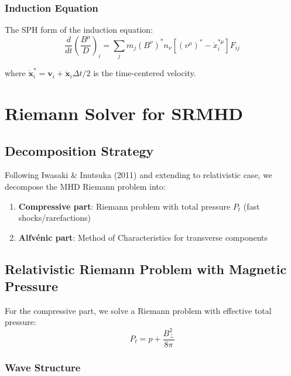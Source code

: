 \documentclass[12pt,a4paper]{article}
\begin{document}
\subsubsection{Induction Equation}

The SPH form of the induction equation:
\begin{equation}
\frac{d}{dt}\left(\frac{B^\mu}{D}\right)_i = \sum_j m_j (B^\nu)^* n_\nu
\left[(v^\mu)^* - \dot{x}_i^{*\mu}\right] F_{ij}
\label{eq:induction_sph}
\end{equation}

where $\dot{\bm{x}}_i^* = \bm{v}_i + \ddot{\bm{x}}_i \Delta t / 2$ is the time-centered velocity.

\section{Riemann Solver for SRMHD}

\subsection{Decomposition Strategy}

Following Iwasaki \& Inutsuka (2011) and extending to relativistic case, we decompose the
MHD Riemann problem into:

\begin{enumerate}
    \item \textbf{Compressive part}: Riemann problem with total pressure $P_t$ (fast shocks/rarefactions)
    \item \textbf{Alfv\'enic part}: Method of Characteristics for transverse components
\end{enumerate}

\subsection{Relativistic Riemann Problem with Magnetic Pressure}

For the compressive part, we solve a Riemann problem with effective total pressure:
\begin{equation}
P_t = p + \frac{B_\perp^2}{8\pi}
\label{eq:total_pressure}
\end{equation}

\subsubsection{Wave Structure}
\end{document}
